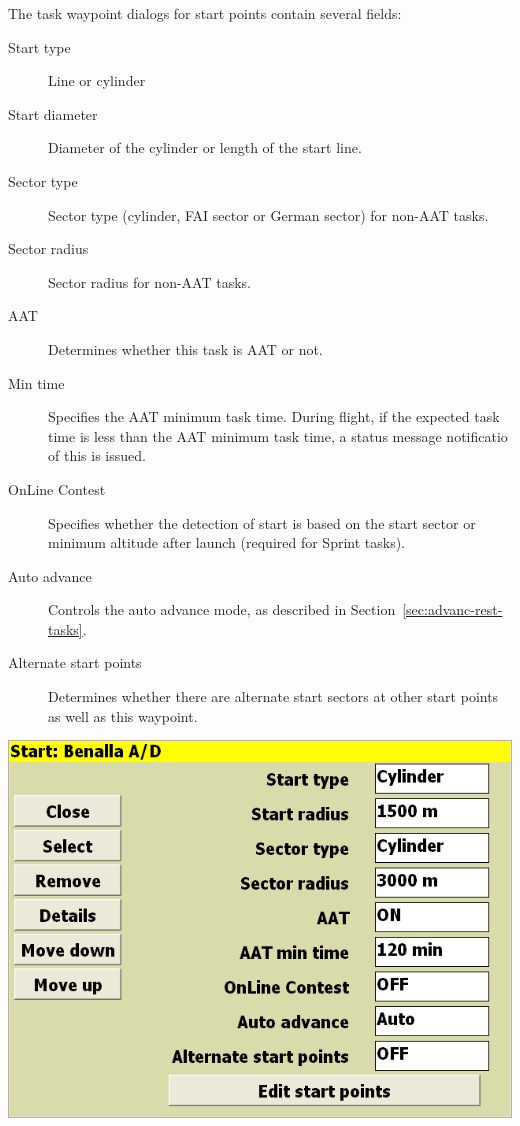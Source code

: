 \documentclass[a4paper,12pt]{refrep}
\begin{document}
The task waypoint dialogs for start points contain several fields:
\begin{description}
\item[Start type] Line or cylinder
\item[Start diameter] Diameter of the cylinder or length of the start line.
\item[Sector type] Sector type (cylinder, FAI sector or German sector) 
 for non-AAT tasks.
\item[Sector radius] Sector radius for non-AAT tasks.
\item[AAT] Determines whether this task is AAT or not.
\item[Min time] Specifies the AAT minimum task time.  During flight, if the expected task time is less than the AAT minimum task time, a status message notificatio of this is issued.
\item[OnLine Contest]  Specifies whether the detection of start is based
  on the start sector or minimum altitude after launch (required for
  Sprint tasks).
\item[Auto advance] Controls the auto advance mode, as described in Section~\ref{sec:advanc-rest-tasks}.
\item[Alternate start points]  Determines whether there are alternate start sectors at other start points as well as this waypoint.
\end{description}

\begin{center}
\includegraphics[angle=0,width=\linewidth,keepaspectratio='true']{figures/dialog-taskedit3.png}
\end{center}
\end{document}
